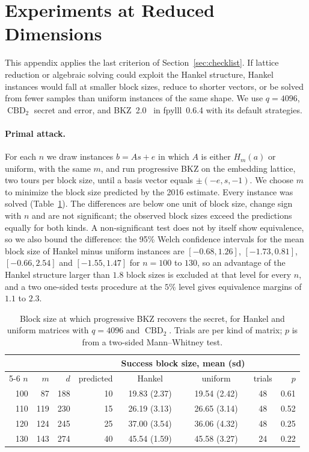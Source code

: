 \documentclass[11pt,a4paper]{article}
\theoremstyle{definition}
\newcommand{\CBD}{\operatorname{CBD}}
\begin{document}
\section{Experiments at Reduced Dimensions}\label{app:reduced}
This appendix applies the last criterion of Section~\ref{sec:checklist}. If lattice reduction or algebraic solving could exploit the Hankel structure, Hankel instances would fall at smaller block sizes, reduce to shorter vectors, or be solved from fewer samples than uniform instances of the same shape. We use $q = 4096$, $\CBD_2$ secret and error, and BKZ~2.0~\cite{chen2011bkz} in fpylll~0.6.4 with its default strategies.

\paragraph{Primal attack.} For each $n$ we draw instances $b = As + e$ in which $A$ is either $H_m(a)$ or uniform, with the same $m$, and run progressive BKZ on the embedding lattice, two tours per block size, until a basis vector equals $\pm(-e, s, -1)$. We choose $m$ to minimize the block size predicted by the 2016 estimate. Every instance was solved (Table~\ref{tab:reduced}). The differences are below one unit of block size, change sign with $n$ and are not significant; the observed block sizes exceed the predictions equally for both kinds. A non-significant test does not by itself show equivalence, so we also bound the difference: the 95\% Welch confidence intervals for the mean block size of Hankel minus uniform instances are $[-0.68, 1.26]$, $[-1.73, 0.81]$, $[-0.66, 2.54]$ and $[-1.55, 1.47]$ for $n = 100$ to $130$, so an advantage of the Hankel structure larger than $1.8$ block sizes is excluded at that level for every $n$, and a two one-sided tests procedure at the $5\%$ level gives equivalence margins of $1.1$ to $2.3$.

\begin{table}[H]
\centering
\small
\begin{tabular}{rrrr cc cr}
\toprule
& & & & \multicolumn{2}{c}{Success block size, mean (sd)} & & \\
\cmidrule(lr){5-6}
$n$ & $m$ & $d$ & predicted & Hankel & uniform & trials & $p$ \\
\midrule
100 &  87 & 188 & 10 & 19.83 (2.37) & 19.54 (2.42) & 48 & 0.61 \\
110 & 119 & 230 & 15 & 26.19 (3.13) & 26.65 (3.14) & 48 & 0.52 \\
120 & 124 & 245 & 25 & 37.00 (3.54) & 36.06 (4.32) & 48 & 0.25 \\
130 & 143 & 274 & 40 & 45.54 (1.59) & 45.58 (3.27) & 24 & 0.22 \\
\bottomrule
\end{tabular}
\caption{Block size at which progressive BKZ recovers the secret, for Hankel and uniform matrices with $q = 4096$ and $\CBD_2$. Trials are per kind of matrix; $p$ is from a two-sided Mann--Whitney test.}
\label{tab:reduced}
\end{table}
\end{document}
